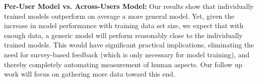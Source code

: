 \noindent
\textbf{Per-User Model vs. Across-Users Model:}
Our results show that individually trained models outperform on average a more general model. Yet, given the increase in model performance with training data set size, we expect that with enough data, a generic model will perform reasonably close to the individually trained models. This would have significant practical implications, eliminating the need for survey-based feedback (which is only necessary for model training), and thereby completely automating measurement of human aspects. Our follow up work will focus on gathering more data toward this end.





